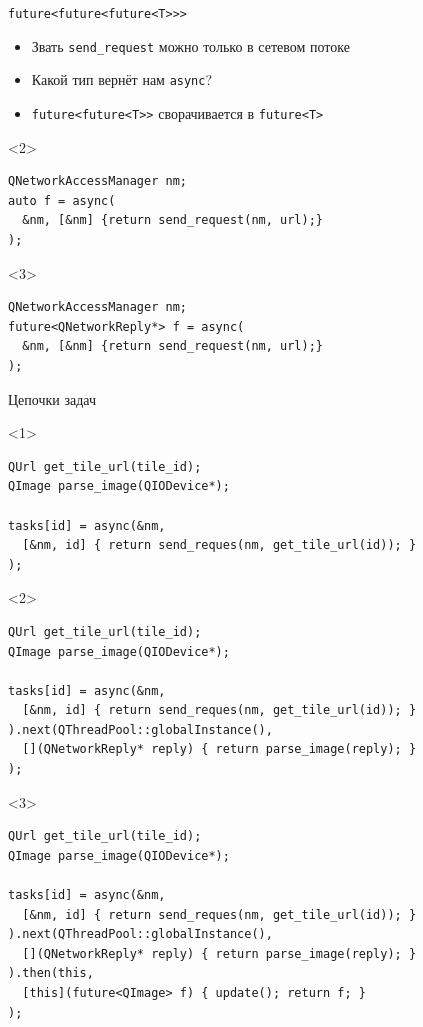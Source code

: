 \documentclass[aspectratio=169,pdf,hyperref={unicode},14pt]{beamer}
\begin{document}
\begin{frame}[fragile,t]{\texttt{future<future<future<T>{}>{}>}}
 \begin{itemize}[<+->]
  \item Звать \texttt{send\_request} можно только в сетевом потоке
  \item Какой тип вернёт нам \texttt{async}?
  \item \texttt{future<future<T>{}>} сворачивается в \texttt{future<T>}
 \end{itemize}
 \begin{onlyenv}<2>
 \begin{lstlisting}[style=cppcode]
QNetworkAccessManager nm;
auto f = async(
  &nm, [&nm] {return send_request(nm, url);}
);
 \end{lstlisting}
 \end{onlyenv}
 \begin{onlyenv}<3>
 \begin{lstlisting}[style=cppcode]
QNetworkAccessManager nm;
future<QNetworkReply*> f = async(
  &nm, [&nm] {return send_request(nm, url);}
);
 \end{lstlisting}
 \end{onlyenv}
\end{frame}

\begin{frame}[fragile,t]{Цепочки задач}
 \begin{onlyenv}<1>
 \begin{lstlisting}[style=cppcode]
QUrl get_tile_url(tile_id);
QImage parse_image(QIODevice*);

tasks[id] = async(&nm,
  [&nm, id] { return send_reques(nm, get_tile_url(id)); }
);
 \end{lstlisting}
 \end{onlyenv}
 \begin{onlyenv}<2>
 \begin{lstlisting}[style=cppcode]
QUrl get_tile_url(tile_id);
QImage parse_image(QIODevice*);

tasks[id] = async(&nm,
  [&nm, id] { return send_reques(nm, get_tile_url(id)); }
).next(QThreadPool::globalInstance(),
  [](QNetworkReply* reply) { return parse_image(reply); }
);
 \end{lstlisting}
 \end{onlyenv}
 \begin{onlyenv}<3>
 \begin{lstlisting}[style=cppcode]
QUrl get_tile_url(tile_id);
QImage parse_image(QIODevice*);

tasks[id] = async(&nm,
  [&nm, id] { return send_reques(nm, get_tile_url(id)); }
).next(QThreadPool::globalInstance(),
  [](QNetworkReply* reply) { return parse_image(reply); }
).then(this,
  [this](future<QImage> f) { update(); return f; }
);
 \end{lstlisting}
 \end{onlyenv}
\end{frame}
\end{document}
